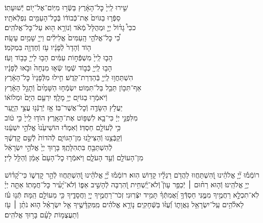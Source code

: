 \documentclass[twoside, openany, parskip=half, 11pt]{book}
\begin{document}
\begin{narrow}
שִׁ֤ירוּ לַֽייָ֙ כׇּל־הָאָ֔רֶץ \hfill בַּשְּֿׂר֥וּ מִיּֽוֹם־אֶל־י֖וֹם יְֿשׁוּעָתֽוֹ׃\\
סַפְּֿר֤וּ בַגּוֹיִם֙ אֶת־כְּֿבוֹד֔וֹ \hfill בְּֿכׇל־הָעַמִּ֖ים נִפְלְֿאֹתָֽיו׃\\
ככִּי֩ גָד֨וֹל יְיָ֤ וּמְהֻלָּל֙ מְֿאֹ֔ד \hfill וְֿנוֹרָ֥א ה֖וּא עַל־כׇּל־אֱלֹהִֽים׃\\
כִּ֠י כׇּל־אֱלֹהֵ֤י הָֽעַמִּים֙ אֱלִילִ֔ים \hfill וַייָ֖ שָׁמַ֥יִם עָשָֽׂה׃\\
ה֤וֹד וְֿהָדָר֙ לְֿפָנָ֔יו \hfill עֹ֥ז וְֿחֶדְוָ֖ה בִּמְקֹמֽוֹ׃\\
הָב֤וּ לַֽייָ֙ מִשְׁפְּֿֿח֣וֹת עַמִּ֔ים \hfill הָב֥וּ לַייָ֖ כָּב֥וֹד וָעֹֽז׃\\
הָב֥וּ לַֽייָ֖ כְּֿב֣וֹד שְֿׁמ֑וֹ \hfill שְֿׂא֤וּ מִנְחָה֙ וּבֹ֣אוּ לְֿפָנָ֔יו\\
הִשְׁתַּחֲו֥וּ לַֽייָ֖ בְּֿהַדְרַת־קֹֽדֶשׁ׃ \hfill חִ֤ילוּ מִלְּֿפָנָיו֙ כׇּל־הָאָ֔רֶץ\\
אַף־תִּכּ֥וֹן תֵּבֵ֖ל בַּל־תִּמּֽוֹט׃ \hfill יִשְׂמְֿח֤וּ הַשָּׁמַ֙יִם֙ וְֿתָגֵ֣ל הָאָ֔רֶץ\\
וְֿיֹאמְֿר֥וּ בַגּוֹיִ֖ם יְיָ֥ מָלָֽךְ׃ \hfill יִרְעַ֤ם הַיָּם֙ וּמְלוֹא֔וֹ\\
יַעֲלֹ֥ץ הַשָּׂדֶ֖ה וְֿכׇל־אֲשֶׁר־בּֽוֹ׃ \hfill אָ֥ז יְֿרַנְּֿנ֖וּ עֲצֵ֣י הַיָּ֑עַר\\
מִלִּפְנֵ֣י יְיָ֔ כִּי־בָ֖א לִשְׁפּ֥וֹט אֶת־הָאָֽרֶץ׃ \hfill הוֹד֤וּ לַֽייָ֙ כִּ֣י ט֔וֹב\\
כִּ֥י לְֿעוֹלָ֖ם חַסְדּֽוֹ׃ \hfill וְֿאִמְר֕וּ הוֹשִׁיעֵ֙נוּ֙ אֱלֹהֵ֣י יִשְׁעֵ֔נוּ\\
וְֿקַבְּֿצֵ֥נוּ וְֿהַצִּילֵ֖נוּ מִן־הַגּוֹיִ֑ם \hfill לְֿהֹדוֹת֙ לְֿשֵׁ֣ם קׇדְשֶׁ֔ךָ\\
לְֿהִשְׁתַּבֵּ֖חַ בִּתְהִלָּתֶֽךָ׃ \hfill בָּר֤וּךְ יְיָ֙ אֱלֹהֵ֣י יִשְׂרָאֵ֔ל\\
מִן־הָעוֹלָ֖ם וְֿעַ֣ד הָעֹלָ֑ם וַיֹּאמְֿר֤וּ כׇל־הָעָם֙ אָמֵ֔ן \hfill וְֿהַלֵּ֖ל לַייָ׃\\
\end{narrow}

\newcommand{\negline}{\vspace{-\baselineskip}}

\negline

%
רוֹמְֿמ֡וּ יְ֘יָ֤ אֱלֹהֵ֗ינוּ וְֽֿ֭הִשְׁתַּחֲווּ לַהֲדֹ֥ם רַגְלָ֗יו קָד֥וֹשׁ הֽוּא׃ 
רוֹמְֿמ֡וּ יְ֘יָ֤ אֱלֹהֵ֗ינוּ וְֽֿ֭הִשְׁתַּחֲווּ לְֿהַ֣ר קׇדְשׁ֑וֹ כִּי־קָ֝ד֗וֹשׁ יְיָ֥ אֱלֹהֵֽינוּ׃ 
%
וְֿה֤וּא רַח֨וּם ׀ יְֿכַפֵּ֥ר עָוֺן֮ וְֽֿלֹא־יַֽ֫שְׁחִ֥ית וְֿ֭הִרְבָּה לְֿהָשִׁ֣יב אַפּ֑וֹ 
וְֿלֹא־יָ֝עִ֗יר כׇּל־חֲמָתֽוֹ׃ 
%
אַתָּ֤ה יְיָ֗ לֹֽא־תִכְלָ֣א רַחֲמֶ֣יךָ מִמֶּ֑נִּי חַסְדְּֿֿךָ֥ וַ֝אֲמִתְּֿךָ֗ תָּמִ֥יד יִצְּֿרֽוּנִי׃ 
זְכֹר־רַחֲמֶ֣יךָ יְיָ֭ וַחֲסָדֶ֑יךָ כִּ֖י מֵעוֹלָ֣ם הֵֽמָּה׃ 
תְּֿנ֥וּ עֹ֗ז לֵאלֹ֫הִ֥ים עַֽל־יִשְׂרָאֵ֥ל גַּאֲוָת֑וֹ וְֿ֝עֻזּ֗וֹ בַּשְּֿׁחָקִֽים׃ 
נ֤וֹרָ֥א אֱלֹהִ֗ים מִֽמִּקְדָּ֫שֶׁ֥יךָ אֵ֤ל יִשְׂרָאֵ֗ל 
ה֤וּא נֹתֵ֨ן ׀ עֹ֖ז וְֿתַעֲצֻמ֥וֹת לָעָ֗ם בָּר֥וּךְ אֱלֹהִֽים׃ 
\end{document}
